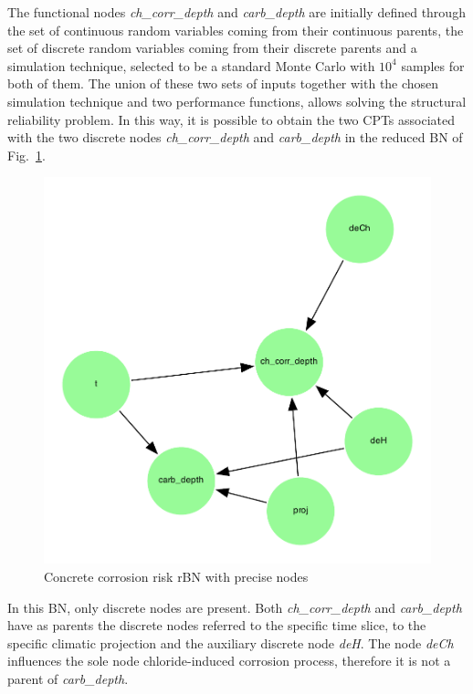 The functional nodes \textit{ch\_corr\_depth} and \textit{carb\_depth} are initially defined through the set of continuous random variables coming from their continuous parents, the set of discrete random variables coming from their discrete parents and a simulation technique, selected to be a standard Monte Carlo with $10^4$ samples for both of them.
The union of these two sets of inputs together with the chosen simulation technique and two performance functions, allows solving the structural reliability problem. 
In this way, it is possible to obtain the two CPTs associated with the two discrete nodes \textit{ch\_corr\_depth} and \textit{carb\_depth} in the reduced BN of Fig.~\ref{fig:precise_rbn}. 

\begin{figure}[H]
    \centering
    \includegraphics[scale=0.5]{imgs/pdfs/13_total_rbn_precise.pdf}
    \caption{Concrete corrosion risk rBN with precise nodes}\label{fig:precise_rbn}
\end{figure}

In this BN, only discrete nodes are present. Both \textit{ch\_corr\_depth} and \textit{carb\_depth} have as parents the discrete nodes referred to the specific time slice, to the specific climatic projection and the auxiliary discrete node \textit{deH}. The node \textit{deCh} influences the sole node chloride-induced corrosion process, therefore it is not a parent of \textit{carb\_depth}.

